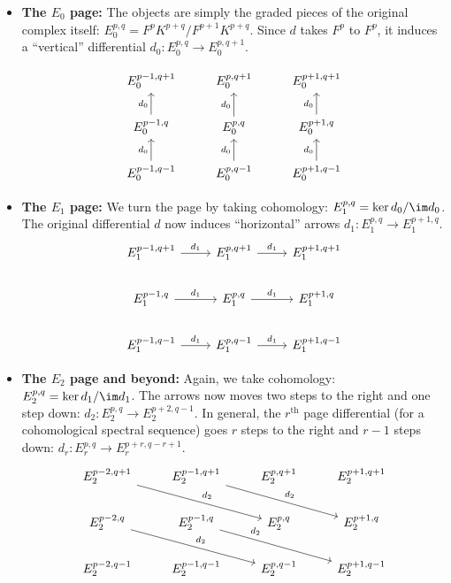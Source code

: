 \begin{itemize}

\item \textbf{The $E_0$ page:} The objects are simply the graded pieces of the original complex itself: $E_0^{p,q} = F^pK^{p+q}/F^{p+1}K^{p+q}$. Since $d$ takes $F^p$ to $F^p$, it induces a ``vertical'' differential $d_0: E_0^{p,q} \to E_0^{p,q+1}$.

\[\begin{tikzcd}
E_0^{p-1, q+1} & E_0^{p, q+1} & E_0^{p+1, q+1} \\
E_0^{p-1, q} \arrow[u, "d_0"] & E_0^{p, q} \arrow[u, "d_0"] & E_0^{p+1, q} \arrow[u, "d_0"] \\
E_0^{p-1, q-1} \arrow[u, "d_0"] & E_0^{p, q-1} \arrow[u, "d_0"] & E_0^{p+1, q-1} \arrow[u, "d_0"]
\end{tikzcd}\]

\item \textbf{The $E_1$ page:} We turn the page by taking cohomology: $E_1^{p,q} = \ker d_0 / \im d_0$. The original differential $d$ now induces ``horizontal'' arrows $d_1: E_1^{p,q} \to E_1^{p+1, q}$. 
\[\begin{tikzcd}
E_1^{p-1, q+1} \arrow[r, "d_1"] & E_1^{p, q+1} \arrow[r, "d_1"] & E_1^{p+1, q+1} \\
E_1^{p-1, q} \arrow[r, "d_1"] & E_1^{p, q} \arrow[r, "d_1"] & E_1^{p+1, q} \\
E_1^{p-1, q-1} \arrow[r, "d_1"] & E_1^{p, q-1} \arrow[r, "d_1"] & E_1^{p+1, q-1}
\end{tikzcd}\]

\item \textbf{The $E_2$ page and beyond:} Again, we take cohomology: $E_2^{p,q} = \ker d_1 / \im d_1$. The arrows now moves two steps to the right and one step down: $d_2: E_2^{p,q} \to E_2^{p+2, q-1}$. In general, the $r^\text{th}$ page differential (for a cohomological spectral sequence) goes $r$ steps to the right and $r-1$ steps down: $d_r: E_r^{p,q} \to E_r^{p+r, q-r+1}$.
\[\begin{tikzcd}
E_2^{p-2, q+1} \arrow[drr, "d_2"] & E_2^{p-1, q+1}\arrow[drr, "d_2"] & E_2^{p, q+1} & E_2^{p+1, q+1} \\
E_2^{p-2, q}\arrow[drr, "d_2"] & E_2^{p-1, q} \arrow[drr, "d_2" near start] & E_2^{p, q} & E_2^{p+1, q} \\
E_2^{p-2, q-1} & E_2^{p-1, q-1} & E_2^{p, q-1} & E_2^{p+1, q-1}
\end{tikzcd}\]
\end{itemize}

